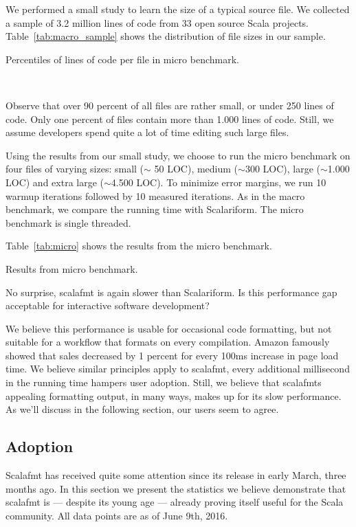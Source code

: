 We performed a small study to learn the size of a typical source file.
We collected a sample of 3.2 million lines of code from 33 open source Scala projects.
Table~\ref{tab:macro_sample} shows the distribution of file sizes in our sample.
\begin{table}
  \centering
  \caption{Percentiles of lines of code per file in micro benchmark.}~\label{tab:macro_sample}
  
\end{table}
Observe that over 90 percent of all files are rather small, or under 250 lines of code.
Only one percent of files contain more than 1.000 lines of code.
Still, we assume developers spend quite a lot of time editing such large files.

Using the results from our small study, we choose to run the micro benchmark on four files of varying sizes: small ($\sim$ 50 LOC), medium ($\sim$300 LOC), large ($\sim$1.000 LOC) and extra large ($\sim$4.500 LOC).
To minimize error margins, we run 10 warmup iterations followed by 10 measured iterations.
As in the macro benchmark, we compare the running time with Scalariform.
The micro benchmark is single threaded.

Table~\ref{tab:micro} shows the results from the micro benchmark.
\begin{table}[H]
  \centering
  \caption{Results from micro benchmark.}\label{tab:micro}
  
\end{table}
No surprise, scalafmt is again slower than Scalariform.
Is this performance gap acceptable for interactive software development?

We believe this performance is usable for occasional code formatting, but not suitable for a workflow that formats on every compilation.
Amazon famously showed that sales decreased by 1 percent for every 100ms increase in page load time\autocite{kohavi2007online}.
We believe similar principles apply to scalafmt, every additional millisecond in the running time hampers user adoption.
Still, we believe that scalafmts appealing formatting output, in many ways, makes up for its slow performance.
As we'll discuss in the following section, our users seem to agree.

\subsection{Adoption}\label{sec:adoption}
Scalafmt has received quite some attention since its release in early March, three months ago.
In this section we present the statistics we believe demonstrate that scalafmt is --- despite its young age --- already proving itself useful for the Scala community.
All data points are as of June 9th, 2016.

